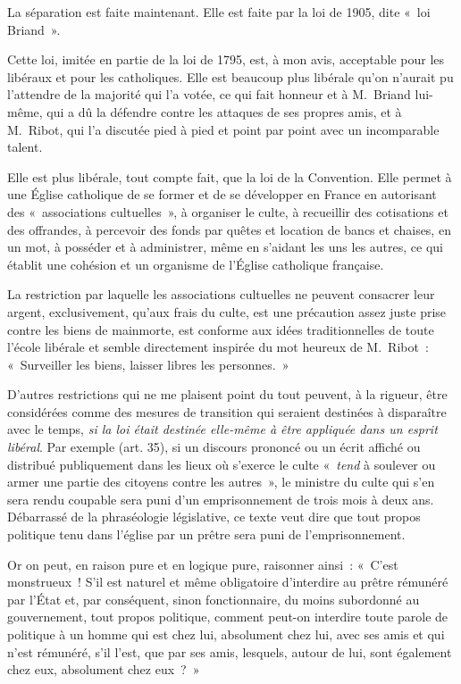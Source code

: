 \documentclass[french,twoside]{book} %
\begin{document}
\noindent La séparation est faite maintenant. Elle est faite par la loi de 1905, dite « loi Briand ».\par
Cette loi, imitée en partie de la loi de 1795, est, à mon avis, acceptable pour les libéraux et pour les catholiques. Elle est beaucoup plus libérale qu’on n’aurait pu l’attendre de la majorité qui l’a votée, ce qui fait honneur et à M. Briand lui-même, qui a dû la défendre contre les attaques de ses propres amis, et à M. Ribot, qui l’a discutée pied à pied et point par point avec un incomparable talent.\par
Elle est plus libérale, tout compte fait, que la loi de la Convention. Elle permet à une Église catholique de se former et de se développer en France en autorisant des « associations cultuelles », à organiser le culte, à recueillir des cotisations et des offrandes, à percevoir des fonds par quêtes et location de bancs et chaises, en un  mot, à posséder et à administrer, même en s’aidant les uns les autres, ce qui établit une cohésion et un organisme de l’Église catholique française.\par
La restriction par laquelle les associations cultuelles ne peuvent consacrer leur argent, exclusivement, qu’aux frais du culte, est une précaution assez juste prise contre les biens de mainmorte, est conforme aux idées traditionnelles de toute l’école libérale et semble directement inspirée du mot heureux de M. Ribot : « Surveiller les biens, laisser libres les personnes. »\par
D’autres restrictions qui ne me plaisent point du tout peuvent, à la rigueur, être considérées comme des mesures de transition qui seraient destinées à disparaître avec le temps, {\itshape si la loi était destinée elle-même à être appliquée dans un esprit libéral}. Par exemple (art. 35), si un discours prononcé ou un écrit affiché ou distribué publiquement dans les lieux où s’exerce le culte « {\itshape tend} à soulever ou armer une partie des citoyens contre les autres », le ministre du culte qui s’en sera rendu coupable sera puni d’un emprisonnement de trois mois à deux ans. Débarrassé de la phraséologie législative, ce texte veut dire que tout propos politique tenu dans l’église par un prêtre sera puni de l’emprisonnement.\par
 Or on peut, en raison pure et en logique pure, raisonner ainsi : « C’est monstrueux ! S’il est naturel et même obligatoire d’interdire au prêtre rémunéré par l’État et, par conséquent, sinon fonctionnaire, du moins subordonné au gouvernement, tout propos politique, comment peut-on interdire toute parole de politique à un homme qui est chez lui, absolument chez lui, avec ses amis et qui n’est rémunéré, s’il l’est, que par ses amis, lesquels, autour de lui, sont également chez eux, absolument chez eux ? »\par
\end{document}
